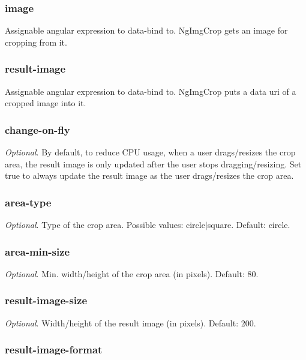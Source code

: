 \subsubsection*{image}

Assignable angular expression to data-\/bind to. Ng\+Img\+Crop gets an image for cropping from it.

\subsubsection*{result-\/image}

Assignable angular expression to data-\/bind to. Ng\+Img\+Crop puts a data uri of a cropped image into it.

\subsubsection*{change-\/on-\/fly}

{\itshape Optional}. By default, to reduce C\+PU usage, when a user drags/resizes the crop area, the result image is only updated after the user stops dragging/resizing. Set true to always update the result image as the user drags/resizes the crop area.

\subsubsection*{area-\/type}

{\itshape Optional}. Type of the crop area. Possible values\+: circle$\vert$square. Default\+: circle.

\subsubsection*{area-\/min-\/size}

{\itshape Optional}. Min. width/height of the crop area (in pixels). Default\+: 80.

\subsubsection*{result-\/image-\/size}

{\itshape Optional}. Width/height of the result image (in pixels). Default\+: 200.

\subsubsection*{result-\/image-\/format}

